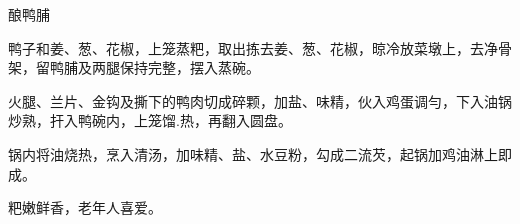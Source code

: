 \begin{recipe}{酿鸭脯}

\ingredients


\cooking

\step 鸭子和姜、葱、花椒，上笼蒸粑，取出拣去姜、葱、花椒，晾冷放菜墩上，去净骨架，留鸭脯及两腿保持完整，摆入蒸碗。

\step 火腿、兰片、金钩及撕下的鸭肉切成碎颗，加盐、味精，伙入鸡蛋调勻，下入油锅炒熟，扞入鸭碗内，上笼馏.热，再翻入圆盘。

\step 锅内将油烧热，烹入清汤，加味精、盐、水豆粉，勾成二流芡，起锅加鸡油淋上即成。

\notes

粑嫩鲜香，老年人喜爱。

\end{recipe}

